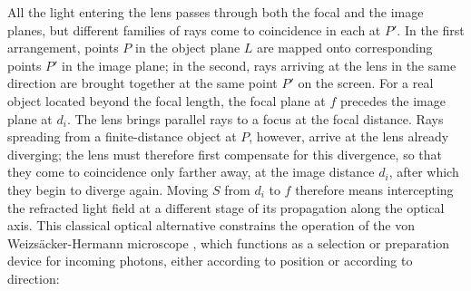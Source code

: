 \documentclass[final,12pt]{article}
\newcommand{\vW}{von Weizsäcker\xspace}
\newcommand{\HW}{\vW-Hermann\xspace}
\begin{document}
All the light entering the lens passes through both the focal and the image planes, but different families of rays come to coincidence in each at $P'$. In the first arrangement, points $P$ in the object plane $L$ are mapped onto corresponding points $P'$ in the image plane; in the second, rays arriving at the lens in the same direction are brought together at the same point $P'$ on the screen. For a real object located beyond the focal length, the focal plane at $f$ precedes the image plane at $d_i$. The lens brings parallel rays to a focus at the focal distance. Rays spreading from a finite-distance object at $P$, however, arrive at the lens already diverging; the lens must therefore first compensate for this divergence, so that they come to coincidence only farther away, at the image distance $d_i$, after which they begin to diverge again. Moving $S$ from $d_i$ to $f$ therefore means intercepting the refracted light field at a different stage of its propagation along the optical axis. This classical optical alternative constrains the operation of the \HW microscope \citep[\S10]{Hermann1935}, which functions as a selection or preparation device for incoming photons, either according to position or according to direction:
%
\end{document}
